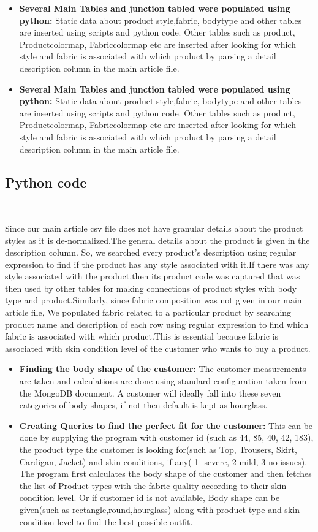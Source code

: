 \documentclass[11pt,journal,compsoc]{IEEEtran}
\begin{document}
\begin{itemize}
    \item[\ding{220}] \textbf{Several Main Tables and junction tabled were populated using python:} Static data about product style,fabric, bodytype and other tables are inserted using scripts and python code. Other tables such as product, Productcolormap, Fabriccolormap etc are inserted after looking for which style and fabric is associated with which product by parsing a detail description column in the main article file.\\
    \item[\ding{220}] \textbf{Several Main Tables and junction tabled were populated using python:} Static data about product style,fabric, bodytype and other tables are inserted using scripts and python code. Other tables such as product, Productcolormap, Fabriccolormap etc are inserted after looking for which style and fabric is associated with which product by parsing a detail description column in the main article file.
\end{itemize}

\subsection{Python code} \

Since our main article csv file does not have granular details about the product styles as it is de-normalized.The general details about the product is given in the description column. So, we searched every product’s description using regular expression to find if the product has any style associated with it.If there was any style associated with the product,then its product code was captured that was then used by other tables for making connections of product styles with body type and product.Similarly, since fabric composition was not given in our main article file, We populated fabric related to a particular product by searching product name and description of each row using regular expression to find which fabric is associated with which product.This is essential because fabric is associated with skin condition level of the customer who wants to buy a product.
\begin{itemize}
    \item[\ding{118}] \textbf{Finding the body shape of the customer:}{ The customer measurements are taken and calculations are done using standard configuration taken from the MongoDB document. A customer will ideally fall into these seven categories of body shapes, if not then default is kept as hourglass.}
    \item[\ding{118}] \textbf{Creating Queries to find the perfect fit for the customer:}{ This can be done by supplying the program with customer id (such as  44, 85, 40, 42, 183), the product type the customer is looking for(such as Top, Trousers, Skirt, Cardigan, Jacket) and skin conditions, if any( 1- severe, 2-mild, 3-no issues). The program first calculates the body shape of the customer and then fetches the list of Product types with the fabric quality according to their skin condition level. Or if customer id is not available, Body shape can be given(such as rectangle,round,hourglass) along with product type and skin condition level to find the best possible outfit.}
\end{itemize}
\end{document}
